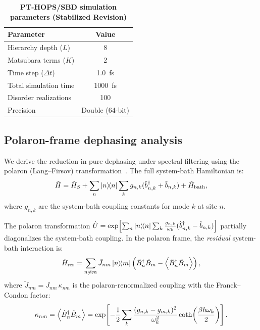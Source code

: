 \documentclass[11pt,a4paper]{article}
\begin{document}
\begin{table}[h]
\centering
\caption{\textbf{PT-HOPS/SBD simulation parameters (Stabilized Revision)}}
\label{tab:SI_parameters}
\begin{tabular}{lc}
\toprule
\textbf{Parameter} & \textbf{Value} \\
\midrule
Hierarchy depth ($L$) & 8 \\
Matsubara terms ($K$) & 2 \\
Time step ($\Delta t$) & \SI{1.0}{\femto\second} \\
Total simulation time & \SI{1000}{\femto\second} \\
Disorder realizations & 100 \\
Precision & Double (64-bit) \\
\bottomrule
\end{tabular}
\end{table}

\subsection{Polaron-frame dephasing analysis}
\label{sec:polaron_dephasing}

We derive the reduction in pure dephasing under spectral filtering using the polaron (Lang--Firsov) transformation~\cite{Huelga2013,Chin2011}. The full system-bath Hamiltonian is:
\begin{equation}
\hat{H} = \hat{H}_S + \sum_n \dyad{n} \sum_k g_{n,k}(\hat{b}_{n,k}^\dagger + \hat{b}_{n,k}) + \hat{H}_{\mathrm{bath}},
\label{eq:SI_full_hamiltonian}
\end{equation}
where $g_{n,k}$ are the system-bath coupling constants for mode $k$ at site $n$.

The polaron transformation $\hat{U} = \exp\!\left[\sum_n \dyad{n} \sum_k \frac{g_{n,k}}{\omega_k}(\hat{b}_{n,k}^\dagger - \hat{b}_{n,k})\right]$ partially diagonalizes the system-bath coupling. In the polaron frame, the \textit{residual} system-bath interaction is:
\begin{equation}
\hat{H}_{\mathrm{res}} = \sum_{n \neq m} \tilde{J}_{nm} \dyad{n}{m} \left(\hat{B}_n^\dagger \hat{B}_m - \expval{\hat{B}_n^\dagger \hat{B}_m}\right),
\label{eq:SI_residual}
\end{equation}
where $\tilde{J}_{nm} = J_{nm}\, \kappa_{nm}$ is the polaron-renormalized coupling with the Franck--Condon factor:
\begin{equation}
\kappa_{nm} = \expval{\hat{B}_n^\dagger \hat{B}_m} = \exp\!\left[-\frac{1}{2}\sum_k \frac{(g_{n,k} - g_{m,k})^2}{\omega_k^2} \coth\!\left(\frac{\beta\hbar\omega_k}{2}\right)\right].
\label{eq:SI_FC_factor}
\end{equation}
\end{document}
